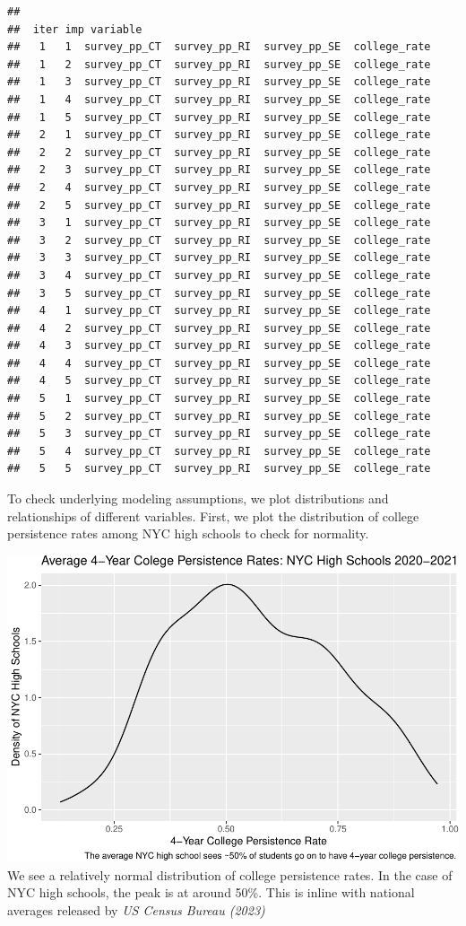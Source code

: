 \documentclass[
  man]{apa6}
\begin{document}
\begin{verbatim}
## 
##  iter imp variable
##   1   1  survey_pp_CT  survey_pp_RI  survey_pp_SE  college_rate
##   1   2  survey_pp_CT  survey_pp_RI  survey_pp_SE  college_rate
##   1   3  survey_pp_CT  survey_pp_RI  survey_pp_SE  college_rate
##   1   4  survey_pp_CT  survey_pp_RI  survey_pp_SE  college_rate
##   1   5  survey_pp_CT  survey_pp_RI  survey_pp_SE  college_rate
##   2   1  survey_pp_CT  survey_pp_RI  survey_pp_SE  college_rate
##   2   2  survey_pp_CT  survey_pp_RI  survey_pp_SE  college_rate
##   2   3  survey_pp_CT  survey_pp_RI  survey_pp_SE  college_rate
##   2   4  survey_pp_CT  survey_pp_RI  survey_pp_SE  college_rate
##   2   5  survey_pp_CT  survey_pp_RI  survey_pp_SE  college_rate
##   3   1  survey_pp_CT  survey_pp_RI  survey_pp_SE  college_rate
##   3   2  survey_pp_CT  survey_pp_RI  survey_pp_SE  college_rate
##   3   3  survey_pp_CT  survey_pp_RI  survey_pp_SE  college_rate
##   3   4  survey_pp_CT  survey_pp_RI  survey_pp_SE  college_rate
##   3   5  survey_pp_CT  survey_pp_RI  survey_pp_SE  college_rate
##   4   1  survey_pp_CT  survey_pp_RI  survey_pp_SE  college_rate
##   4   2  survey_pp_CT  survey_pp_RI  survey_pp_SE  college_rate
##   4   3  survey_pp_CT  survey_pp_RI  survey_pp_SE  college_rate
##   4   4  survey_pp_CT  survey_pp_RI  survey_pp_SE  college_rate
##   4   5  survey_pp_CT  survey_pp_RI  survey_pp_SE  college_rate
##   5   1  survey_pp_CT  survey_pp_RI  survey_pp_SE  college_rate
##   5   2  survey_pp_CT  survey_pp_RI  survey_pp_SE  college_rate
##   5   3  survey_pp_CT  survey_pp_RI  survey_pp_SE  college_rate
##   5   4  survey_pp_CT  survey_pp_RI  survey_pp_SE  college_rate
##   5   5  survey_pp_CT  survey_pp_RI  survey_pp_SE  college_rate
\end{verbatim}

To check underlying modeling assumptions, we plot distributions and relationships of different variables. First, we plot the distribution of college persistence rates among NYC high schools to check for normality.

\includegraphics{final-project_files/figure-latex/unnamed-chunk-2-1.pdf}
We see a relatively normal distribution of college persistence rates. In the case of NYC high schools, the peak is at around 50\%. This is inline with national averages released by \emph{US Census Bureau (2023)}
\end{document}
